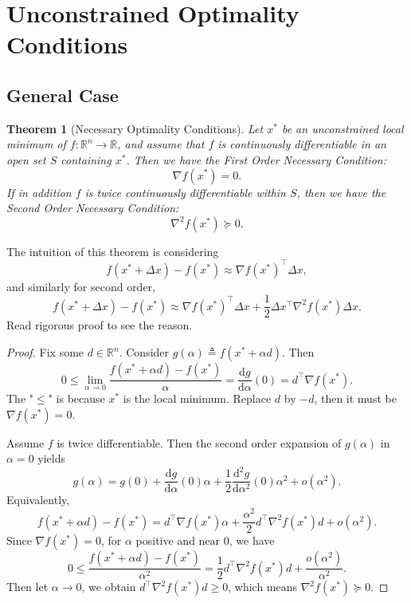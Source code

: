 \documentclass[12pt,a4paper]{report}
\numberwithin{equation}{section}
\theoremstyle{mystyle}
\newtheorem{theorem}[definition]{Theorem}
\newcommand{\R}{\mathbb{R}}
\newcommand{\grad}{\nabla}
\renewcommand{\d}{\mathrm{d}}
\newcommand{\T}{\top}
\begin{document}
	\section{Unconstrained Optimality Conditions}
	\subsection{General Case}
	\begin{theorem}[Necessary Optimality Conditions]
		Let $x^*$ be an unconstrained local minimum of $f:\R^n \to \R$, and assume that $f$ is continuously differentiable in an open set $S$ containing $x^*$. Then we have the \emph{First Order Necessary Condition}:
		\begin{equation}
			\grad f(x^*)=0.
		\end{equation}
		If in addition $f$ is twice continuously differentiable within $S$, then we have the \emph{Second Order Necessary Condition}:
		\begin{equation}
			\grad^2 f(x^*)\succeq 0.
		\end{equation}
	\end{theorem}
	The intuition of this theorem is considering
	$$
	f(x^*+\Delta x)-f(x^*)\approx \grad f(x^*)^\T \Delta x,
	$$
	and similarly for second order,
	$$
	f(x^*+\Delta x)-f(x^*)\approx \grad f(x^*)^\T \Delta x +\frac{1}{2}\Delta x^\T \grad^2 f(x^*)\Delta x.
	$$
	Read rigorous proof to see the reason.
	\begin{proof}
		Fix some $d\in \R^n$. Consider $g(\alpha)\triangleq f(x^*+\alpha d)$. Then
		$$
		0\leq 
		\lim_{\alpha\to 0}\frac{f(x^*+\alpha d)-f(x^*)}{\alpha} 
		= \frac{\d g}{\d \alpha}(0)=d^\T \grad f(x^*).
		$$
		The "$\leq$" is because $x^*$ is the local minimum. Replace $d$ by $-d$, then it must be $\grad f(x^*)=0$.
		
		Assume $f$ is twice differentiable. Then the second order expansion of $g(\alpha)$ in $\alpha=0$ yields
		$$
		g(\alpha) = g(0) + \frac{\d g}{\d \alpha}(0)\alpha +
		\frac{1}{2} \frac{\d^2 g}{\d \alpha^2}(0) \alpha^2 + o(\alpha^2).
		$$
		Equivalently,
		$$
		f(x^*+\alpha d) - f(x^*) = d^\T \grad f(x^*)\alpha + \frac{\alpha^2}{2} d^\T \grad^2 f(x^*) d + o(\alpha^2).
		$$
		Since $\grad f(x^*)=0$, for $\alpha$ positive and near 0, we have
		$$
		0\leq \frac{f(x^*+\alpha d)-f(x^*)}{\alpha^2}= 
		\frac{1}{2} d^\T \grad^2 f(x^*) d + \frac{o(\alpha^2)}{\alpha^2}.
		$$
		Then let $\alpha\to 0$, we obtain $d^\T \grad^2 f(x^*) d\geq 0$, which means $\grad^2 f(x^*) \succeq 0$.
	\end{proof}
	
\end{document}
